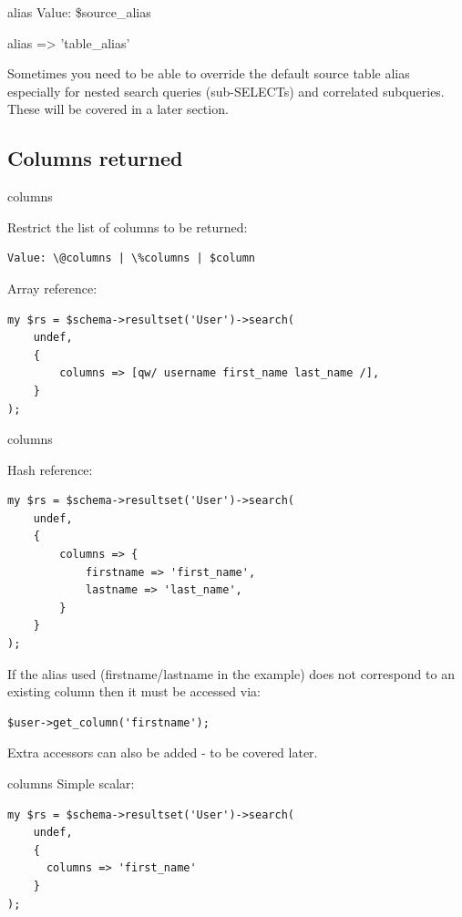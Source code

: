 \begin{frame}[fragile]{alias}
Value: \$source\_alias

    alias => 'table\_alias'

\end{frame}

Sometimes you need to be able to override the default source table alias especially for nested search queries (sub-SELECTs) and correlated subqueries. These will be covered in a later section.

\subsection{Columns returned}
\begin{frame}[fragile]{columns}

Restrict the list of columns to be returned:

\begin{lstlisting}
Value: \@columns | \%columns | $column
\end{lstlisting}

Array reference:

\begin{lstlisting}
my $rs = $schema->resultset('User')->search(
    undef,
    {
        columns => [qw/ username first_name last_name /],
    }
);
\end{lstlisting}
\end{frame}

\begin{frame}[fragile]{columns}

Hash reference:

\begin{lstlisting}
my $rs = $schema->resultset('User')->search(
    undef,
    {
        columns => {
            firstname => 'first_name',
            lastname => 'last_name',
        }
    }
);
\end{lstlisting}
\end{frame}

If the alias used (firstname/lastname in the example) does not correspond to
an existing column then it must be accessed via:

\begin{lstlisting}
$user->get_column('firstname');
\end{lstlisting}

Extra accessors can also be added - to be covered later.


\begin{frame}[fragile]{columns}
Simple scalar:

\begin{lstlisting}
my $rs = $schema->resultset('User')->search(
    undef,
    {
      columns => 'first_name'
    }
);
\end{lstlisting}

\end{frame}

